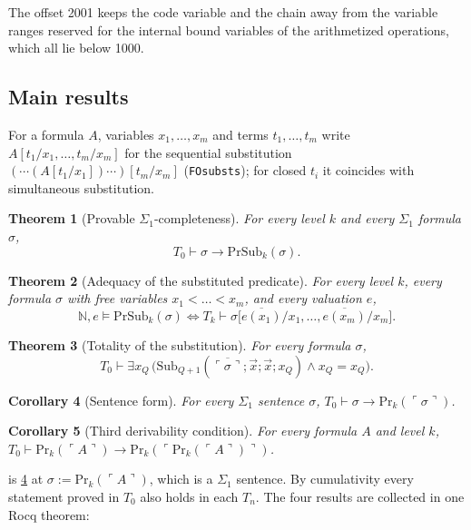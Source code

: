 \documentclass[11pt]{article}
\theoremstyle{plain}
\newtheorem{theorem}{Theorem}[section]
\newtheorem{corollary}[theorem]{Corollary}
\theoremstyle{definition}
\theoremstyle{remark}
\newcommand{\N}{\mathbb{N}}
\newcommand{\T}[1]{T_{#1}}
\newcommand{\Prv}{\mathrm{Pr}}
\newcommand{\gn}[1]{\ulcorner #1 \urcorner}
\newcommand{\num}[1]{\overline{#1}}
\newcommand{\Sub}{\mathrm{Sub}}
\newcommand{\PSub}{\mathrm{PrSub}}
\newcommand{\rocq}[1]{\texttt{#1}}
\newcommand{\sat}{\models}
\begin{document}
The offset 2001 keeps the code variable and the chain away from the
variable ranges reserved for the internal bound variables of the
arithmetized operations, which all lie below 1000.

\subsection{Main results}

For a formula $A$, variables $x_1,\dots,x_m$ and terms $t_1,\dots,t_m$
write $A[t_1/x_1,\dots,t_m/x_m]$ for the sequential substitution
$(\cdots(A[t_1/x_1])\cdots)[t_m/x_m]$ (\rocq{FOsubsts}); for closed
$t_i$ it coincides with simultaneous substitution.

\begin{theorem}[Provable $\Sigma_1$-completeness]\label{thm:open}
For every level $k$ and every $\Sigma_1$ formula $\sigma$,
\[
  \T0 \vdash \sigma \to \PSub_k(\sigma).
\]
\end{theorem}

\begin{theorem}[Adequacy of the substituted predicate]\label{thm:meaning}
For every level $k$, every formula $\sigma$ with free variables
$x_1<\dots<x_m$, and every valuation $e$,
\[
  \N, e \sat \PSub_k(\sigma) \iff
  \T{k} \vdash \sigma\bigl[\num{e(x_1)}/x_1, \dots, \num{e(x_m)}/x_m\bigr].
\]
\end{theorem}

\begin{theorem}[Totality of the substitution]\label{thm:total}
For every formula $\sigma$,
\[
  \T0 \vdash \exists x_Q\, \bigl(\Sub_{Q+1}(\num{\gn{\sigma}}; \vec x; \vec x; x_Q)
  \wedge x_Q = x_Q\bigr).
\]
\end{theorem}

\begin{corollary}[Sentence form]\label{cor:sentence}
For every $\Sigma_1$ sentence $\sigma$,
$\T0 \vdash \sigma \to \Prv_k(\gn{\sigma})$.
\end{corollary}

\begin{corollary}[Third derivability condition]\label{cor:d3}
For every formula $A$ and level $k$,
$\T0 \vdash \Prv_k(\gn{A}) \to \Prv_k(\gn{\Prv_k(\gn{A})})$.
\end{corollary}

 is \cref{cor:sentence} at $\sigma := \Prv_k(\gn{A})$,
which is a $\Sigma_1$ sentence.  By cumulativity every statement proved
in $\T0$ also holds in each $\T{n}$.  The four results are collected in
one Rocq theorem:
\end{document}
